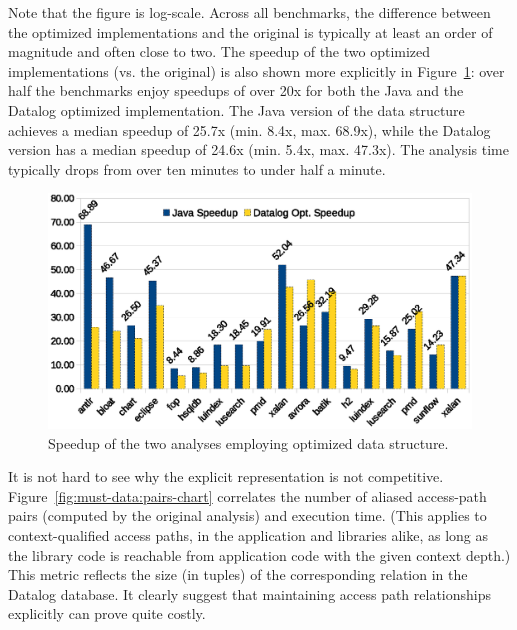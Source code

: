Note that the figure is log-scale. Across all benchmarks, the difference between the optimized implementations and the original is typically at least an order of magnitude and often close to two.  The speedup of the two optimized implementations (vs. the original) is also shown more explicitly in Figure~\ref{fig:must-data:speedup-chart}: over half the benchmarks enjoy speedups of over 20x for both the Java and the Datalog optimized implementation. The Java version of the data structure achieves a median speedup of 25.7x (min. 8.4x, max. 68.9x), while the Datalog version has a median speedup of 24.6x (min. 5.4x, max. 47.3x).  The analysis time typically drops from over ten minutes to under half a minute. 

\begin{figure}[htp]
\centering
\includegraphics[clip,width=0.77\linewidth, height=0.4275\linewidth]{assets/must-data/speedup.eps}
\caption{Speedup of the two analyses employing optimized data structure.}
\label{fig:must-data:speedup-chart}
\end{figure}

It is not hard to see why the explicit representation is not competitive. Figure~\ref{fig:must-data:pairs-chart} correlates the number of aliased access-path pairs (computed by the original analysis) and execution time. (This applies to context-qualified access paths, in the application and libraries alike, as long as the library code is reachable from application code with the given context depth.) This metric reflects the size (in tuples) of the corresponding relation in the Datalog database. It clearly suggest that maintaining access path relationships explicitly can prove quite costly.

